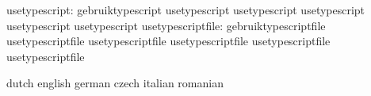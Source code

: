     usetypescript: gebruiktypescript          usetypescript
                   usetypescript              usetypescript
                   usetypescript              usetypescript
usetypescriptfile: gebruiktypescriptfile      usetypescriptfile
                   usetypescriptfile          usetypescriptfile
                   usetypescriptfile          usetypescriptfile

\stopcommands




\startcommands                    dutch                            english
                                  german                           czech
                                  italian                          romanian

